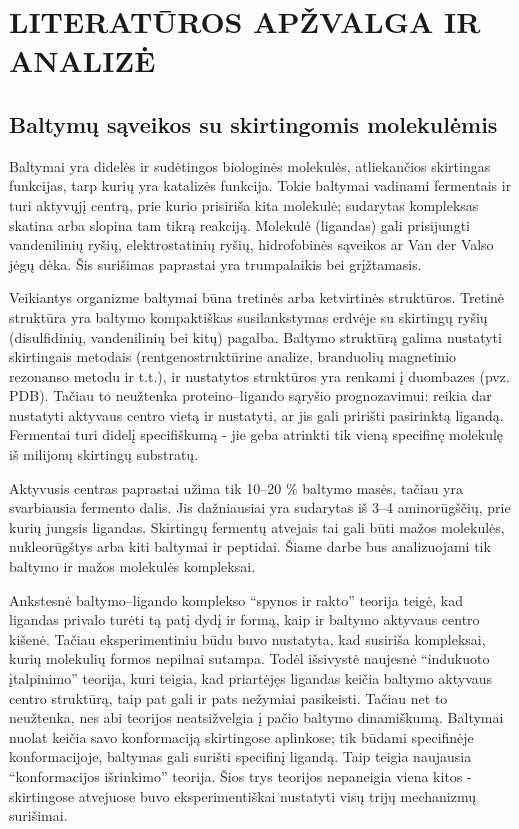 
\section{LITERATŪROS APŽVALGA IR ANALIZĖ}

\subsection{Baltymų sąveikos su skirtingomis molekulėmis}

Baltymai yra didelės ir sudėtingos biologinės molekulės, atliekančios skirtingas funkcijas, tarp kurių yra katalizės funkcija. Tokie baltymai vadinami fermentais ir turi aktyvųjį centrą, prie kurio prisiriša kita molekulė; sudarytas kompleksas skatina arba slopina tam tikrą reakciją. Molekulė (ligandas) gali prisijungti vandenilinių ryšių, elektrostatinių ryšių, hidrofobinės sąveikos ar Van der Valso jėgų dėka.\cite{du_insights_2016} Šis surišimas paprastai yra trumpalaikis bei grįžtamasis. 

Veikiantys organizme baltymai būna tretinės arba ketvirtinės struktūros. Tretinė struktūra yra baltymo kompaktiškas susilankstymas erdvėje su skirtingų ryšių (disulfidinių, vandenilinių bei kitų) pagalba. Baltymo struktūrą galima nustatyti skirtingais metodais (rentgenostruktūrine analize, branduolių magnetinio rezonanso metodu ir t.t.),\cite{du_insights_2016} ir nustatytos struktūros yra renkami į duombazes (pvz. PDB). Tačiau to neužtenka proteino--ligando sąryšio prognozavimui: reikia dar nustatyti aktyvaus centro vietą ir nustatyti, ar jis gali pririšti pasirinktą ligandą. Fermentai turi didelį specifiškumą - jie geba atrinkti tik vieną specifinę molekulę iš milijonų skirtingų substratų.

Aktyvusis centras paprastai užima tik 10--20 \% baltymo masės, tačiau yra svarbiausia fermento dalis. Jis dažniausiai yra sudarytas iš 3--4 aminorūgščių, prie kurių jungsis ligandas.\cite{du_insights_2016} Skirtingų fermentų atvejais tai gali būti mažos molekulės, nukleorūgštys arba kiti baltymai ir peptidai. Šiame darbe bus analizuojami tik baltymo ir mažos molekulės kompleksai.

Ankstesnė baltymo--ligando komplekso \enquote{spynos ir rakto} teorija teigė, kad ligandas privalo turėti tą patį dydį ir formą, kaip ir baltymo aktyvaus centro kišenė. Tačiau eksperimentiniu būdu buvo nustatyta, kad susiriša kompleksai, kurių molekulių formos nepilnai sutampa.\cite{du_insights_2016} Todėl išsivystė naujesnė \enquote{indukuoto įtalpinimo} teorija, kuri teigia, kad priartėjęs ligandas keičia baltymo aktyvaus centro struktūrą, taip pat gali ir pats nežymiai pasikeisti. Tačiau net to neužtenka, nes abi teorijos neatsižvelgia į pačio baltymo dinamiškumą. Baltymai nuolat keičia savo konformaciją skirtingose aplinkose; tik būdami specifinėje konformacijoje, baltymas gali surišti specifinį ligandą. Taip teigia naujausia \enquote{konformacijos išrinkimo} teorija. Šios trys teorijos nepaneigia viena kitos - skirtingose atvejuose buvo eksperimentiškai nustatyti visų trijų mechanizmų surišimai.\cite{du_insights_2016}

